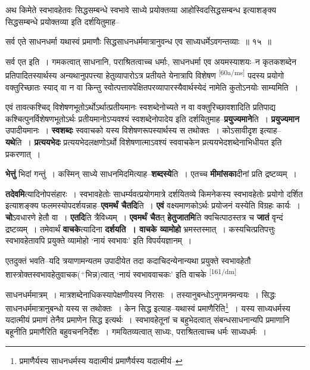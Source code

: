 \documentclass[article,12pt,a4paper]{memoir}
\newcommand{\add}[1]{($^{+}$#1)}
\begin{document}
	अथ किमेते स्वभावहेतवः सिद्धसम्बन्धे स्वभावे साध्ये प्रयोक्तव्या आहोस्विदसिद्धसम्बन्ध इत्याशङ्क्य सिद्धसम्बन्धे प्रयोक्तव्या इति दर्शयितुमाह-- 
	  
	सर्व एते साधनधर्मा यथास्वं प्रमाणौः सिद्धसाधनधर्ममात्रानुवन्ध एव साध्यधर्मेऽवगन्तव्याः ॥ १५ ॥ 
	  
	सर्व एत इति । गमकत्वात् साधनानि, पराश्रितत्वाच्च धर्माः, साधनधर्मा एव अयमस्याशयः--न कृतकशब्देन प्रतिपादितस्यार्थस्य अन्यथानुपपत्त्या हेतुव्यापारोऽत्र प्रतीयते येनात्रापि विशेषण \leavevmode\textsuperscript{\rmlatinfont\tiny [60a/ms]} पदस्य प्रयोगो वक्तुरिच्छातः स्याद् वा न वा किन्तु स्वोत्पत्तावपेक्षितपरव्यापारस्यैवार्थस्येदं नामेति कुतोऽनयोः साम्यमिति ।
	\pend
      

	  \pstart एवं तावत्कश्चिद् विशेषणभूतोऽर्थोऽर्थात्प्रतीयमानः स्वशब्देनोच्यते न वा वक्तुरिच्छावशादिति प्रतिपाद्य कश्चित्पुनर्विशेषणभूतोऽर्थः प्रतीयमानोऽप्यवश्यं स्वशब्देनोपादेय इति दर्शयितुमाह--\textbf{प्रयुज्यमाने}ति । \textbf{प्रयुज्यमान} उपादीयमानः । \textbf{स्वशब्दः} स्ववाचको यस्य विशेषणरूपस्यार्थस्य स तथोक्तः । कोऽसावीदृश इत्याह--\textbf{यथे}ति । \textbf{प्रत्ययभेदः} प्रत्ययभेदलक्षणोऽर्थो विशेषणात्माऽवश्यं स्ववाचकेन प्रत्ययभेदशब्देनाभिधीयत इति प्रकरणात् ।
	\pend
      

	  \pstart \textbf{भेत्तुं} भिदां गन्तुं । कस्मिन् साध्ये साधनमिदमित्याह--\textbf{शब्दस्ये}ति । एतच्च \textbf{मीमांसका}दीनां प्रति द्रष्टव्यम् ।
	\pend
      

	  \pstart \textbf{तदेवमि}त्यादिनोपसंहारः । स्वभावहेतोः साधर्म्यवत्प्रयोगमात्रे दर्शयितव्ये किमनेकस्य स्वभावहेतोः प्रयोगो दर्शित इत्याशङ्क्य फलमस्योपदर्शयन्नाह--\textbf{एवमर्थं चैतदि}ति । \textbf{एवं} वक्ष्यमाणकोऽर्थः प्रयोजनं यस्येति विग्रहः कार्यः । \textbf{चो}ऽवधारणे हेतौ वा । \textbf{एतदि}ति त्रैविध्यम् । \textbf{एवमर्थं चैत}त् \textbf{हेतुजातमि}ति क्वचित्पाठस्तत्र च \textbf{जातं} वृन्दं द्रष्टव्यम् । तमेवार्थं \textbf{वाचके}त्यादिना \textbf{दर्शयति । वाचके व्यामोहो} भ्रमस्तस्मात् । कस्यचित्प्रतिपत्तुः स्वभावहेतावपि प्रयुक्ते व्यामोहो ‘नायं स्वभावः’ इति विपर्ययज्ञानम् ।
	\pend
      

	  \pstart एतदुक्तं भवति--यदि त्रयाणामन्यतम उपादीयेत तदा कदाचिदन्येनान्यथा प्रयुक्ते स्वभावहेतौ शास्त्रोक्तस्वभावहेतुवाचक\add{भिन्न}त्वात् ‘नायं स्वभाववाचकः’ इति वाचके  \leavevmode\textsuperscript{\rmlatinfont\tiny [161/dm]} 
	  
	साधनधर्ममात्रम् । मात्रशब्देनाधिकस्यापेक्षणीयस्य निरासः । तस्यानुबन्धोऽनुगमनमन्वयः । सिद्धः साधनधर्ममात्रानुबन्धो यस्य स तथोक्तः । केन सिद्ध इत्याह--यथास्वं प्रमाणैरिति\footnote{प्रमाणैर्यस्य साधनधर्मस्य यदात्मीयं \cite{dp-msC} \cite{dp-msD} प्रमाणैर्यस्य यदात्मीयं--\cite{dp-msB}} । यस्य साध्यधर्मस्य यदात्मीयं प्रमाणं तेनैव प्रमाणेन सिद्ध इत्यर्थः । स्वभावहेतूनां च बहुभेदत्वात् संबन्धसाधनान्यपि प्रमाणानि बहूनीति प्रमाणैरिति बहुवचननिर्देशः । गमयितव्यत्वात् साध्यः, पराश्रितत्वाच्च धर्मः साध्यधर्मः । 
	  
\end{document}
